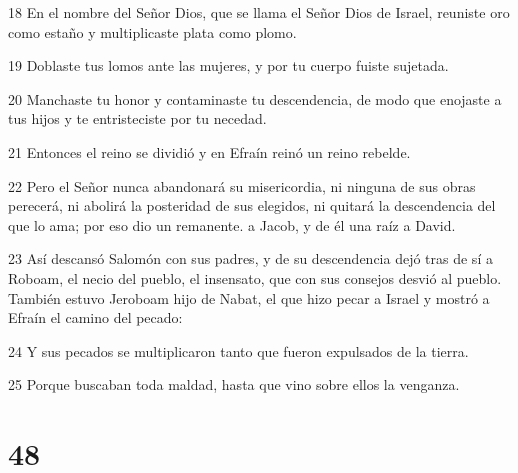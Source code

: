 \par 18 En el nombre del Señor Dios, que se llama el Señor Dios de Israel, reuniste oro como estaño y multiplicaste plata como plomo.
\par 19 Doblaste tus lomos ante las mujeres, y por tu cuerpo fuiste sujetada.
\par 20 Manchaste tu honor y contaminaste tu descendencia, de modo que enojaste a tus hijos y te entristeciste por tu necedad.
\par 21 Entonces el reino se dividió y en Efraín reinó un reino rebelde.
\par 22 Pero el Señor nunca abandonará su misericordia, ni ninguna de sus obras perecerá, ni abolirá la posteridad de sus elegidos, ni quitará la descendencia del que lo ama; por eso dio un remanente. a Jacob, y de él una raíz a David.
\par 23 Así descansó Salomón con sus padres, y de su descendencia dejó tras de sí a Roboam, el necio del pueblo, el insensato, que con sus consejos desvió al pueblo. También estuvo Jeroboam hijo de Nabat, el que hizo pecar a Israel y mostró a Efraín el camino del pecado:
\par 24 Y sus pecados se multiplicaron tanto que fueron expulsados ​​de la tierra.
\par 25 Porque buscaban toda maldad, hasta que vino sobre ellos la venganza.

\chapter{48}


